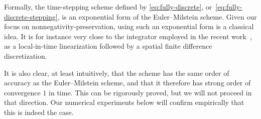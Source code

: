\documentclass[12pt]{article}
\begin{document}
{Formally, the time-stepping scheme defined by \eqref{eq:fully-discrete}, or~\eqref{eq:fully-discrete-stepping}, is an exponential form of the Euler--Milstein scheme. 
Given our focus on nonnegativity-preservation, using such an exponential form is a classical idea. It is for instance very close to the integrator employed in the recent work~\cite{brehier2023analysis}, as a local-in-time linearization followed by a spatial finite difference discretization.

It is also clear, at least intuitively, that the scheme has the same order of accuracy as the Euler--Milstein scheme, and that it therefore has strong order of convergence $1$ in time. This can be rigorously proved, but we will not proceed in that direction. Our numerical experiments below will confirm empirically that this is indeed the case. 

  

}
\end{document}
